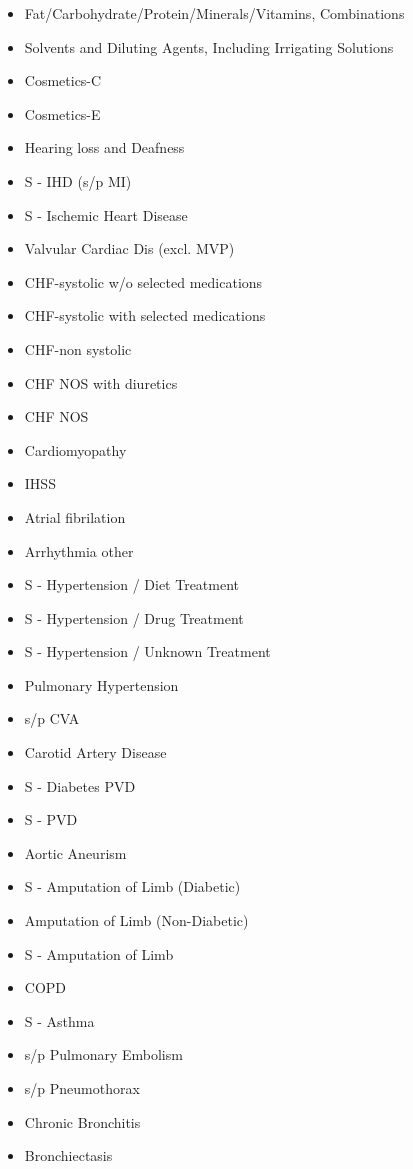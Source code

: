 \documentclass[a4paper,12pt]{article}
\begin{document}
\begin{appendices}
\begin{itemize}
   			\item Fat/Carbohydrate/Protein/Minerals/Vitamins, Combinations
   			\item Solvents and Diluting Agents, Including Irrigating Solutions
   			\item Cosmetics-C
   			\item Cosmetics-E
   			\item Hearing loss and Deafness
   			\item S - IHD (s/p MI)
   			\item S - Ischemic Heart Disease
   			\item Valvular Cardiac Dis (excl. MVP)
   			\item CHF-systolic w/o selected medications
   			\item CHF-systolic with selected medications
   			\item CHF-non systolic
   			\item CHF NOS with diuretics
   			\item CHF NOS
   			\item Cardiomyopathy
   			\item IHSS
   			\item Atrial fibrilation
   			\item Arrhythmia other
   			\item S - Hypertension / Diet Treatment
   			\item S - Hypertension / Drug Treatment
   			\item S - Hypertension / Unknown Treatment
   			\item Pulmonary Hypertension
   			\item s/p CVA
   			\item Carotid Artery Disease
   			\item S - Diabetes PVD
   			\item S - PVD
   			\item Aortic Aneurism
   			\item S - Amputation of Limb (Diabetic)
   			\item Amputation of Limb (Non-Diabetic)
   			\item S - Amputation of Limb
   			\item COPD
   			\item S - Asthma
   			\item s/p Pulmonary Embolism
   			\item s/p Pneumothorax
   			\item Chronic Bronchitis
   			\item Bronchiectasis

\end{itemize}
\end{appendices}
\end{document}
